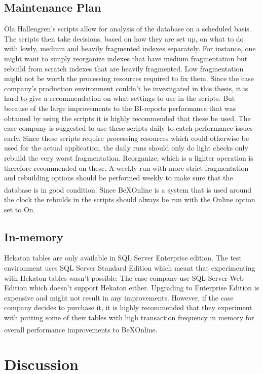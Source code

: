 \documentclass{cslthse-msc}
\newcommand{\bex}{BeX\textsuperscript{\textregistered}}
\begin{document}
\section{Maintenance Plan}
Ola Hallengren's \cite{Hallengren15} scripts allow for analysis of the database on a scheduled basis. The scripts then take decisions, based on how they are set up, on what to do with lowly, medium and heavily fragmented indexes separately. For instance, one might want to simply reorganize indexes that have medium fragmentation but rebuild from scratch indexes that are heavily fragmented. Low fragmentation might not be worth the processing resources required to fix them. Since the case company's production environment couldn't be investigated in this thesis, it is hard to give a recommendation on what settings to use in the scripts. But because of the large improvements to the BI-reports performance that was obtained by using the scripts it is highly recommended that these be used. The case company is suggested to use these scripts daily to catch performance issues early. Since these scripts require processing resources which could otherwise be used for the actual application, the daily runs should only do light checks only rebuild the very worst fragmentation. Reorganize, which is a lighter operation is therefore recommended on these. A weekly run with more strict fragmentation and rebuilding options should be performed weekly to make sure that the database is in good condition. Since \bex Online is a system that is used around the clock the rebuilds in the scripts should always be run with the Online option set to On.

\section{In-memory}
Hekaton tables are only available in SQL Server Enterprise edition. The test environment uses SQL Server Standard Edition which meant that experimenting with Hekaton tables wasn't possible. The case company use SQL Server Web Edition which doesn't support Hekaton either. Upgrading to Enterprise Edition is expensive and might not result in any improvements. However, if the case company decides to purchase it, it is highly recommended that they experiment with putting some of their tables with high transaction frequency in memory for overall performance improvements to \bex Online.

\chapter{Discussion}\label{sec:discussion}
\end{document}
